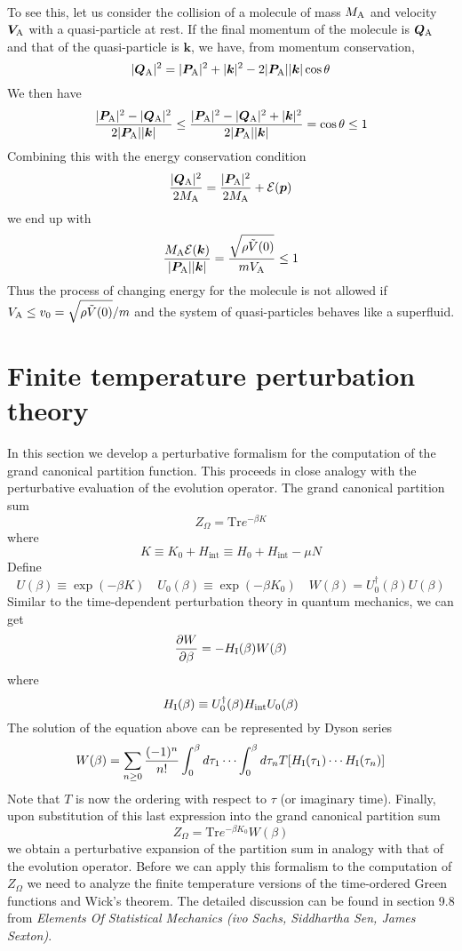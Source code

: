 \\
To see this, let us consider the collision of a molecule of mass $M_{\rm A}$ and velocity $\bm{V}_{\rm A}$ with a quasi-particle at rest. If the final momentum of the molecule is $\bm{Q}_{\rm A}$ and that of the quasi-particle is $\bm{k}$, we have, from momentum conservation,
\[|\bm{Q}_{\rm A}|^2 = |\bm{P}_{\rm A}|^2 + |\bm{k}|^2 - 2|\bm{P}_{\rm A}||\bm{k}|\cos\theta\]
We then have
\[\frac{|\bm{P}_{\rm A}|^2-|\bm{Q}_{\rm A}|^2}{2|\bm{P}_{\rm A}| |\bm{k}|} \leq \frac{|\bm{P}_{\rm A}|^2-|\bm{Q}_{\rm A}|^2 + |\bm{k}|^2}{2|\bm{P}_{\rm A}| |\bm{k}|} = \cos\theta \leq 1\]
Combining this with the energy conservation condition
\[\frac{|\bm{Q}_{\rm A}|^2}{2M_{\rm A}} = \frac{|\bm{P}_{\rm A}|^2}{2M_{\rm A}} + \mathcal{E}(\bm{p})\]
we end up with
\[\frac{M_{\rm A}\mathcal{E}(\bm{k})}{|\bm{P}_{\rm A}| |\bm{k}|} = \frac{\sqrt{\rho \tilde{V}(0)}}{mV_{\rm A}} \leq 1\]
Thus the process of changing energy for the molecule is not allowed if $V_{\rm A} \leq v_0 = \sqrt{\rho \tilde{V}(0)} / m $ and the system of quasi-particles behaves like a superfluid.

\section{Finite temperature perturbation theory}
In this section we develop a perturbative formalism for the computation of the grand canonical partition function. This proceeds in close analogy with the perturbative evaluation of the evolution operator. The grand canonical partition sum 
\[Z_{\Omega} = \mathrm{Tr}e^{-\beta K}\]
where
\[K \equiv K_0 + H_{\mathrm{int}} \equiv H_0 + H_{\mathrm{int}} -\mu N\]
Define
\[U(\beta) \equiv \exp(-\beta K) \quad U_0(\beta) \equiv \exp(-\beta K_0) \quad W(\beta) = U_0^{\dagger}(\beta)U(\beta)\]
Similar to the time-dependent perturbation theory in quantum mechanics, we can get
\[\frac{\partial W}{\partial \beta} = -H_{\rm I}(\beta)W(\beta)\]
where
\[H_{\rm I}(\beta) \equiv U_0^{\dagger}(\beta)H_{\mathrm{int}}U_0(\beta)\]
The solution of the equation above can be represented by Dyson series
\[W(\beta) = \sum_{n \geq 0} \frac{(-1)^n}{n!} \int_0^{\beta}d\tau_1 \cdots \int_0^{\beta} d\tau_n T[H_{\rm I}(\tau_1)\cdots H_{\rm I}(\tau_n)]\]
Note that $T$ is now the ordering with respect to $\tau$ (or imaginary time). Finally, upon substitution of this last expression into the grand canonical partition sum
\[Z_{\Omega} = \mathrm{Tr} e^{-\beta K_0}W(\beta)\]
we obtain a perturbative expansion of the partition sum in analogy with that of the evolution operator. Before we can apply this formalism to the computation of $Z_{\Omega}$ we need to analyze the finite temperature versions of the time-ordered Green functions and Wick's theorem. The detailed discussion can be found in section 9.8 from \emph{Elements Of Statistical Mechanics (ivo Sachs, Siddhartha Sen, James Sexton)}.

